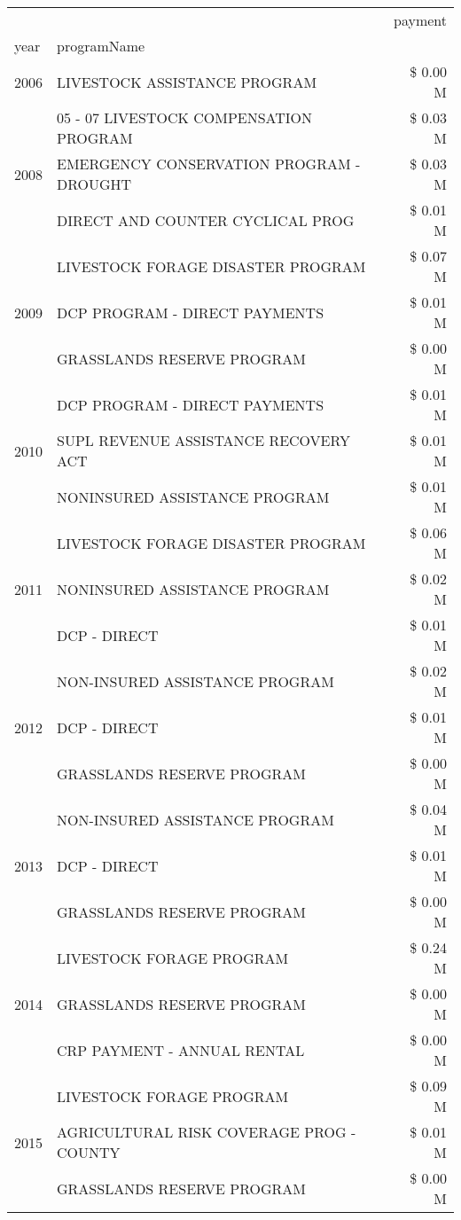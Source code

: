 \begin{tabular}{llr}
\toprule
 &  & payment \\
year & programName &  \\
\midrule
2006 & LIVESTOCK ASSISTANCE PROGRAM & \$ 0.00 M \\
\cline{1-3}
\multirow[t]{3}{*}{2008} & 05 - 07 LIVESTOCK COMPENSATION PROGRAM & \$ 0.03 M \\
 & EMERGENCY CONSERVATION PROGRAM - DROUGHT & \$ 0.03 M \\
 & DIRECT AND COUNTER CYCLICAL PROG & \$ 0.01 M \\
\cline{1-3}
\multirow[t]{3}{*}{2009} & LIVESTOCK FORAGE DISASTER  PROGRAM & \$ 0.07 M \\
 & DCP PROGRAM - DIRECT PAYMENTS & \$ 0.01 M \\
 & GRASSLANDS RESERVE PROGRAM & \$ 0.00 M \\
\cline{1-3}
\multirow[t]{3}{*}{2010} & DCP PROGRAM - DIRECT PAYMENTS & \$ 0.01 M \\
 & SUPL REVENUE ASSISTANCE RECOVERY ACT & \$ 0.01 M \\
 & NONINSURED ASSISTANCE PROGRAM & \$ 0.01 M \\
\cline{1-3}
\multirow[t]{3}{*}{2011} & LIVESTOCK FORAGE DISASTER PROGRAM & \$ 0.06 M \\
 & NONINSURED ASSISTANCE PROGRAM & \$ 0.02 M \\
 & DCP - DIRECT & \$ 0.01 M \\
\cline{1-3}
\multirow[t]{3}{*}{2012} & NON-INSURED ASSISTANCE PROGRAM & \$ 0.02 M \\
 & DCP - DIRECT & \$ 0.01 M \\
 & GRASSLANDS RESERVE PROGRAM & \$ 0.00 M \\
\cline{1-3}
\multirow[t]{3}{*}{2013} & NON-INSURED ASSISTANCE PROGRAM & \$ 0.04 M \\
 & DCP - DIRECT & \$ 0.01 M \\
 & GRASSLANDS RESERVE PROGRAM & \$ 0.00 M \\
\cline{1-3}
\multirow[t]{3}{*}{2014} & LIVESTOCK FORAGE PROGRAM & \$ 0.24 M \\
 & GRASSLANDS RESERVE PROGRAM & \$ 0.00 M \\
 & CRP PAYMENT - ANNUAL RENTAL & \$ 0.00 M \\
\cline{1-3}
\multirow[t]{3}{*}{2015} & LIVESTOCK FORAGE PROGRAM & \$ 0.09 M \\
 & AGRICULTURAL RISK COVERAGE PROG - COUNTY & \$ 0.01 M \\
 & GRASSLANDS RESERVE PROGRAM & \$ 0.00 M \\

\end{tabular}
